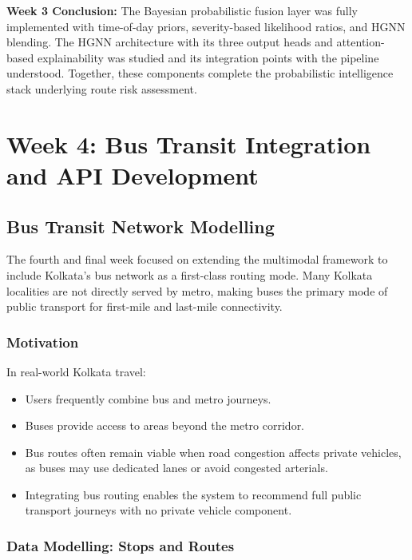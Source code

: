 \documentclass[12pt, a4paper]{report}
\begin{document}
\textbf{Week 3 Conclusion:} The Bayesian probabilistic fusion layer was fully implemented with time-of-day priors, severity-based likelihood ratios, and HGNN blending. The HGNN architecture with its three output heads and attention-based explainability was studied and its integration points with the pipeline understood. Together, these components complete the probabilistic intelligence stack underlying route risk assessment.

\clearpage

\chapter{Week 4: Bus Transit Integration and API Development}
\label{chap:week4}

\section{Bus Transit Network Modelling}

The fourth and final week focused on extending the multimodal framework to include Kolkata's bus network as a first-class routing mode. Many Kolkata localities are not directly served by metro, making buses the primary mode of public transport for first-mile and last-mile connectivity.

\subsection{Motivation}

In real-world Kolkata travel:

\begin{itemize}
    \item Users frequently combine bus and metro journeys.
    \item Buses provide access to areas beyond the metro corridor.
    \item Bus routes often remain viable when road congestion affects private vehicles, as buses may use dedicated lanes or avoid congested arterials.
    \item Integrating bus routing enables the system to recommend full public transport journeys with no private vehicle component.
\end{itemize}

\subsection{Data Modelling: Stops and Routes}
\end{document}
